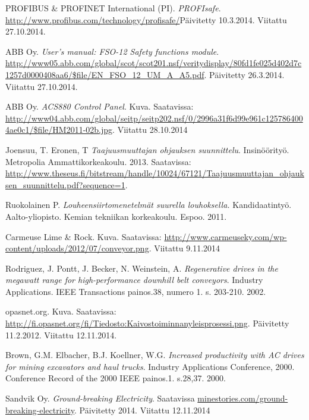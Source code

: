 \documentclass[finnish,12pt,a4paper,pdftex,elec,utf8]{aaltothesis}
\begin{document}
\begin{thebibliography}{99}
 PROFIBUS \& PROFINET International (PI). \textit{PROFIsafe}. \url{http://www.profibus.com/technology/profisafe/}Päivitetty 10.3.2014. Viitattu 27.10.2014.

 ABB Oy. \textit{User's manual: FSO-12 Safety functions module}. \url{http://www05.abb.com/global/scot/scot201.nsf/veritydisplay/80fd1fe025d402d7c1257d0000408aa6/$file/EN_FSO_12_UM_A_A5.pdf}. Päivitetty 26.3.2014. Viitattu 27.10.2014.

ABB Oy. \textit{ACS880 Control Panel}. Kuva. Saatavissa: \url{http://www04.abb.com/global/seitp/seitp202.nsf/0/2996a31f6d99e961c1257864004ae0c1/$file/HM2011-02b.jpg}. Viitattu 28.10.2014

Joensuu, T. Eronen, T \textit{Taajuusmuuttajan ohjauksen suunnittelu}. Insinöörityö. Metropolia Ammattikorkeakoulu. 2013. Saatavissa: \url{http://www.theseus.fi/bitstream/handle/10024/67121/Taajuusmuuttajan_ohjauksen_suunnittelu.pdf?sequence=1}. 

Ruokolainen P. \textit{Louheensiirtomenetelmät suurella louhoksella.} Kandidaatintyö. Aalto-yliopisto. Kemian tekniikan korkeakoulu. Espoo. 2011.

Carmeuse Lime \& Rock. Kuva. Saatavissa: \url{http://www.carmeuseky.com/wp-content/uploads/2012/07/conveyor.png}. Viitattu 9.11.2014

Rodriguez, J. Pontt, J. Becker, N. Weinstein, A. \textit{Regenerative drives in the megawatt range for high-performance downhill belt conveyors}. Industry Applications. IEEE Transactions painos.38, numero 1. s. 203-210. 2002.

opasnet.org. Kuva. Saatavissa: \url{http://fi.opasnet.org/fi/Tiedosto:Kaivostoiminnanyleisprosessi.png}. Päivitetty 11.2.2012. Viitattu 12.11.2014.

Brown, G.M. Elbacher, B.J. Koellner, W.G. \textit{Increased productivity with AC drives for mining excavators and haul trucks}. Industry Applications Conference, 2000. Conference Record of the 2000 IEEE painos.1. s.28,37. 2000.

Sandvik Oy. \textit{Ground-breaking Electricity}. Saatavissa \url{minestories.com/ground-breaking-electricity}. Päivitetty 2014. Viitattu 12.11.2014

\end{thebibliography}



\clearpage
\end{document}
